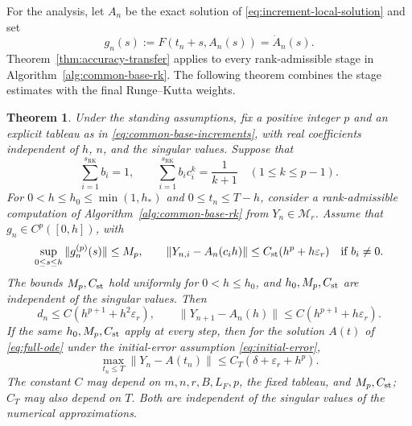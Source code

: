 \documentclass[]{article}
\numberwithin{equation}{section}
\theoremstyle{plain}
\newtheorem{theorem}{Theorem}[section]
\theoremstyle{remark}
\numberwithin{algorithm}{section}
\newcommand{\Mr}{\mathcal{M}_r}
\newcommand{\eps}{\varepsilon}
\begin{document}
For the analysis, let \(A_n\) be the exact solution of
\eqref{eq:increment-local-solution} and set
\begin{equation}\label{eq:flow-field-defined}
 g_n(s):=F(t_n+s,A_n(s))=\dot A_n(s).
\end{equation}
Theorem~\ref{thm:accuracy-transfer} applies to every rank-admissible
stage in Algorithm~\ref{alg:common-base-rk}.  The following theorem
combines the stage estimates with the final Runge--Kutta weights.

\begin{theorem}
\label{thm:rk-stage-criterion}
Under the standing assumptions, fix a
positive integer \(p\) and an explicit tableau as in
\eqref{eq:common-base-increments}, with real coefficients independent of
\(h\), \(n\), and the singular values.  Suppose that
\begin{equation}\label{eq:rk-quadrature-moments}
 \sum_{i=1}^{s_{\mathrm{RK}}}b_i=1,\qquad
 \sum_{i=1}^{s_{\mathrm{RK}}}b_i c_i^k=\frac1{k+1}
 \quad(1\le k\le p-1).
\end{equation}
For \(0<h\le h_0\le\min(1,h_*)\) and \(0\le t_n\le T-h\), consider a
rank-admissible computation of Algorithm~\ref{alg:common-base-rk} from
\(Y_n\in\Mr\).  Assume that \(g_n\in C^p([0,h])\), with
\begin{equation}\label{eq:rk-criterion-assumptions}
 \sup_{0\le s\le h}\|g_n^{(p)}(s)\|\le M_p,\qquad
 \|Y_{n,i}-A_n(c_i h)\|\le C_{\rm st}(h^p+h\eps_r)
 \quad\text{if }b_i\ne0.
\end{equation}
The bounds \(M_p,C_{\rm st}\) hold uniformly for \(0<h\le h_0\), and
\(h_0,M_p,C_{\rm st}\) are independent of the singular values.  Then
\begin{equation}\label{eq:rk-criterion-local}
 d_n\le C(h^{p+1}+h^2\eps_r),\qquad
 \|Y_{n+1}-A_n(h)\|\le C(h^{p+1}+h\eps_r).
\end{equation}
If the same \(h_0,M_p,C_{\rm st}\) apply at every step, then for the
solution \(A(t)\) of \eqref{eq:full-ode} under the initial-error assumption
\eqref{eq:initial-error},
\[
 \max_{t_n\le T}\|Y_n-A(t_n)\|
 \le C_T(\delta+\eps_r+h^p).
\]
The constant \(C\) may depend on \(m,n,r,B,L_F,p\), the fixed tableau,
and \(M_p,C_{\rm st}\); \(C_T\) may also depend on \(T\).
Both are independent of the singular values of the numerical approximations.
\end{theorem}
\end{document}
